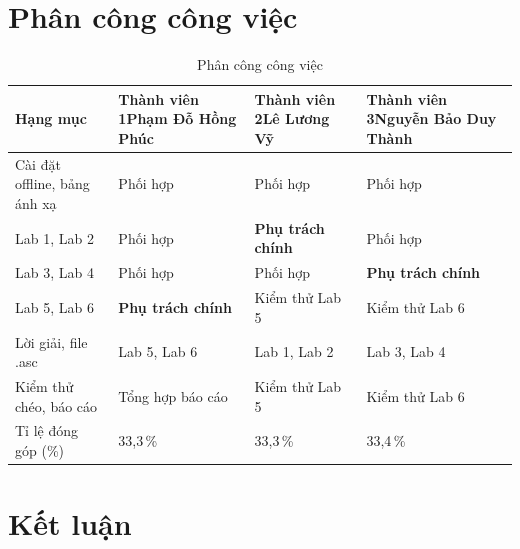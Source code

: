 \documentclass[12pt,a4paper]{article}
\newcommand{\TVa}{Phạm Đỗ Hồng Phúc}   \newcommand{\MSa}{2510359}   \newcommand{\PTa}{-- Lab 5, Lab 6}  %
\newcommand{\TVb}{Lê Lương Vỹ}          \newcommand{\MSb}{2214056}   \newcommand{\PTb}{-- Lab 1, Lab 2}  %
\newcommand{\TVc}{Nguyễn Bảo Duy Thành} \newcommand{\MSc}{2510372}   \newcommand{\PTc}{-- Lab 3, Lab 4}  %
\newcommand{\hc}[1]{\cellcolor{navy}\color{white}\sffamily\bfseries\small #1}
\begin{document}
\section{Phân công công việc}

\begin{table}[H]\centering\small
\caption{Phân công công việc}\label{tab:phancong}
\renewcommand{\arraystretch}{1.5}
\begin{tabular}{|p{4.6cm}|p{3.2cm}|p{3.2cm}|p{3.2cm}|}
\hline
\hc{Hạng mục} & \hc{Thành viên 1\newline\normalfont\scriptsize\TVa} & \hc{Thành viên 2\newline\normalfont\scriptsize\TVb} & \hc{Thành viên 3\newline\normalfont\scriptsize\TVc}\\ \hline
Cài đặt offline, bảng ánh xạ & Phối hợp & Phối hợp & Phối hợp\\ \hline
Lab 1, Lab 2 & Phối hợp & \textbf{Phụ trách chính} & Phối hợp\\ \hline
Lab 3, Lab 4 & Phối hợp & Phối hợp & \textbf{Phụ trách chính}\\ \hline
Lab 5, Lab 6 & \textbf{Phụ trách chính} & Kiểm thử Lab 5 & Kiểm thử Lab 6\\ \hline
Lời giải, file .asc & Lab 5, Lab 6 & Lab 1, Lab 2 & Lab 3, Lab 4\\ \hline
Kiểm thử chéo, báo cáo & Tổng hợp báo cáo & Kiểm thử Lab 5 & Kiểm thử Lab 6\\ \hline
Tỉ lệ đóng góp (\%) & 33,3\,\% & 33,3\,\% & 33,4\,\%\\ \hline
\end{tabular}
\end{table}

\section{Kết luận}
\end{document}

